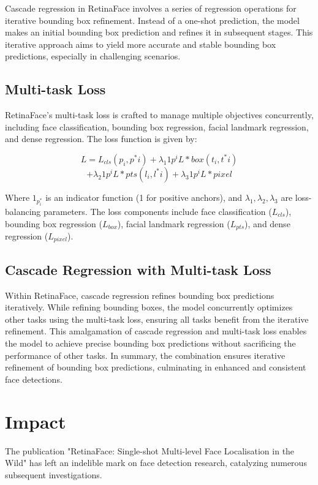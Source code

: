 \documentclass{article}
\begin{document}
Cascade regression in RetinaFace involves a series of regression operations for iterative bounding box refinement. Instead of a one-shot prediction, the model makes an initial bounding box prediction and refines it in subsequent stages. This iterative approach aims to yield more accurate and stable bounding box predictions, especially in challenging scenarios.

\subsection{Multi-task Loss}

RetinaFace's multi-task loss is crafted to manage multiple objectives concurrently, including face classification, bounding box regression, facial landmark regression, and dense regression. The loss function is given by:

\[ L = L_{cls}(p_i, p^*i) + \lambda_1 1{p^i} L*{box}(t_i, t^*i) \]
\[+ \lambda_2 1{p^i} L*{pts}(l_i, l^*i) + \lambda_3 1{p^i} L*{pixel} \]

Where \( 1_{p^*_i} \) is an indicator function (1 for positive anchors), and \( \lambda_1, \lambda_2, \lambda_3 \) are loss-balancing parameters. The loss components include face classification (\(L_{cls}\)), bounding box regression (\(L_{box}\)), facial landmark regression (\(L_{pts}\)), and dense regression (\(L_{pixel}\)).

\subsection{Cascade Regression with Multi-task Loss}

Within RetinaFace, cascade regression refines bounding box predictions iteratively. While refining bounding boxes, the model concurrently optimizes other tasks using the multi-task loss, ensuring all tasks benefit from the iterative refinement. This amalgamation of cascade regression and multi-task loss enables the model to achieve precise bounding box predictions without sacrificing the performance of other tasks. In summary, the combination ensures iterative refinement of bounding box predictions, culminating in enhanced and consistent face detections.

\section{Impact}

The publication "RetinaFace: Single-shot Multi-level Face Localisation in the Wild" has left an indelible mark on face detection research, catalyzing numerous subsequent investigations.
\end{document}
